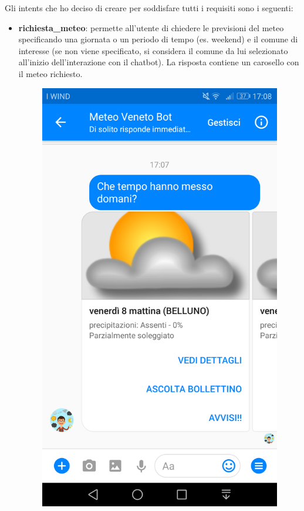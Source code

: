 Gli intents che ho deciso di creare per soddisfare tutti i requisiti sono i seguenti:
\begin{itemize}
	\item \textbf{richiesta\_meteo}: permette all'utente di chiedere le previsioni del meteo specificando una giornata o un periodo di tempo (es. weekend) e il comune di interesse (se non viene specificato, si considera il comune da lui selezionato all'inizio dell'interazione con il \gls{chatbot}). La risposta contiene un carosello con il meteo richiesto.
	\begin{figure}[h!]
		\centering
		\includegraphics[scale=0.12]{../Immagini/richiesta_meteo.png}

\end{figure}
\end{itemize}
